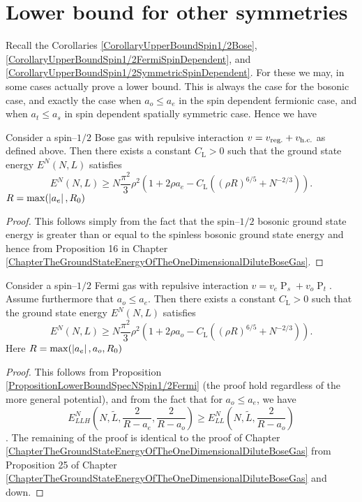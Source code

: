 \section{Lower bound for other symmetries}
Recall the Corollaries \ref{CorollaryUpperBoundSpin1/2Bose}, \ref{CorollaryUpperBoundSpin1/2FermiSpinDependent}, and \ref{CorollaryUpperBoundSpin1/2SymmetricSpinDependent}. For these we may, in some cases actually prove a lower bound. This is always the case for the bosonic case, and exactly the case when $ a_o\leq a_e $ in the spin dependent fermionic case, and when $ a_t\leq a_s $ in spin dependent spatially symmetric case. Hence we have 
\begin{theorem}
	\label{TheoremLowerBoundSpin1/2Bose}
	Consider a spin--$ 1/2 $ Bose gas with repulsive interaction  $v=v_{\textnormal{reg.}}+v_{\textnormal{h.c.}}$ as defined above. Then there exists a constant $C_\text{L}>0$ such that the ground state energy $E^N(N,L)$ satisfies
	\begin{equation}
	\label{eqlowerSpin1/2Bose}
	E^N(N,L)\geq N\frac{\pi^2}{3}\rho^2\left(1+2\rho a_e-C_\text{L}\left((\rho R)^{6/5}+N^{-2/3}\right)\right).
	\end{equation}
	$ R=\max(\left\lvert a_e \right\rvert, R_0) $
\end{theorem}
\begin{proof}
	This follows simply from the fact that the spin--$ 1/2$ bosonic ground state energy is greater than or equal to the spinless bosonic ground state energy and hence from Proposition 16 in Chapter \ref{ChapterTheGroundStateEnergyOfTheOneDimensionalDiluteBoseGas}.
\end{proof}
	\begin{theorem}
	\label{TheoremLowerBoundSpinDependentSpin1/2Fermi}
	Consider a spin--$ 1/2 $ Fermi gas with repulsive interaction  $v=v_e\operatorname{P}_s+v_o\operatorname{P}_t$. Assume furthermore that $ a_o\leq a_e $. Then there exists a constant $C_\text{L}>0$ such that the ground state energy $E^N(N,L)$ satisfies
	\begin{equation}
	\label{eqlowerSpinDependtSpin1/2Fermi}
	E^N(N,L)\geq N\frac{\pi^2}{3}\rho^2\left(1+2\rho a_o-C_\text{L}\left((\rho R)^{6/5}+N^{-2/3}\right)\right).
	\end{equation}
	Here $ R=\max(\left\lvert a_e \right\rvert, a_o, R_0) $
\end{theorem}
\begin{proof}
	This follows from Proposition \ref{PropositionLowerBoundSpecNSpin1/2Fermi} (the proof hold regardless of the more general potential), and from the fact that for $ a_o\leq a_e $, we have $$ E_{LLH}^N\left(N,\tilde{L},\frac{2}{R-a_e},\frac{2}{R-a_o}\right)\geq E^N_{LL}\left(N,\tilde{L},\frac{2}{R-a_o}\right) $$. The remaining of the proof is identical to the proof of Chapter \ref{ChapterTheGroundStateEnergyOfTheOneDimensionalDiluteBoseGas} from Proposition 25 of Chapter \ref{ChapterTheGroundStateEnergyOfTheOneDimensionalDiluteBoseGas} and down.
\end{proof}
